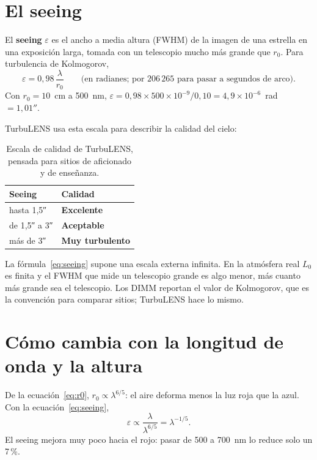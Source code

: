 \section{El seeing}

El \textbf{seeing} $\varepsilon$ es el ancho a media altura (FWHM) de la imagen de una estrella en una exposición larga,
tomada con un telescopio mucho más grande que $r_0$. Para turbulencia de Kolmogorov,
\begin{equation}
\varepsilon = 0{,}98\,\frac{\lambda}{r_0}\qquad\text{(en radianes; por }206\,265\text{ para pasar a segundos de arco)}.
\label{eq:seeing}
\end{equation}
Con $r_0 = 10$~cm a 500~nm, $\varepsilon = 0{,}98 \times 500\times10^{-9} / 0{,}10 = 4{,}9\times10^{-6}$~rad $= 1{,}01''$.

TurbuLENS usa esta escala para describir la calidad del cielo:

\begin{table}[H]
\centering\small
\begin{tabular}{@{}l l@{}}
\toprule
Seeing & Calidad\\
\midrule
hasta 1,5″ & \textcolor{acento}{\textbf{Excelente}}\\
de 1,5″ a 3″ & \textcolor{cobre}{\textbf{Aceptable}}\\
más de 3″ & \textcolor{red!70!black}{\textbf{Muy turbulento}}\\
\bottomrule
\end{tabular}
\caption{Escala de calidad de TurbuLENS, pensada para sitios de aficionado y de enseñanza.}
\end{table}

\begin{nota}
La fórmula~\eqref{eq:seeing} supone una escala externa infinita. En la atmósfera real $L_0$ es finita y el FWHM que mide un
telescopio grande es algo menor, más cuanto más grande sea el telescopio. Los DIMM reportan el valor de Kolmogorov,
que es la convención para comparar sitios; TurbuLENS hace lo mismo.
\end{nota}

\section{Cómo cambia con la longitud de onda y la altura}

De la ecuación~\eqref{eq:r0}, $r_0 \propto \lambda^{6/5}$: el aire deforma menos la luz roja que la azul. Con la
ecuación~\eqref{eq:seeing},
\begin{equation}
\varepsilon \propto \frac{\lambda}{\lambda^{6/5}} = \lambda^{-1/5} .
\end{equation}
El seeing mejora muy poco hacia el rojo: pasar de 500 a 700~nm lo reduce solo un 7\,\%.

